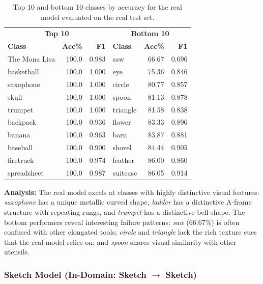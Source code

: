 \documentclass[12pt, a4paper]{article}
\begin{document}
\begin{table}[H]
\centering
\caption{Top 10 and bottom 10 classes by accuracy for the real model evaluated
on the real test set.}
\label{tab:top_bottom_real}
\begin{tabular}{lrr|lrr}
\toprule
\multicolumn{3}{c|}{\textbf{Top 10}} & \multicolumn{3}{c}{\textbf{Bottom 10}} \\
\textbf{Class} & \textbf{Acc\%} & \textbf{F1} &
\textbf{Class} & \textbf{Acc\%} & \textbf{F1} \\
\midrule
The Mona Lisa     & 100.0 & 0.983 & saw        & 66.67 & 0.696 \\
basketball        & 100.0 & 1.000 & eye        & 75.36 & 0.846 \\
saxophone         & 100.0 & 1.000 & circle     & 80.77 & 0.857 \\
skull              & 100.0 & 1.000 & spoon      & 81.13 & 0.878 \\
trumpet           & 100.0 & 1.000 & triangle   & 81.58 & 0.838 \\
backpack          & 100.0 & 0.936 & flower     & 83.33 & 0.896 \\
banana            & 100.0 & 0.963 & barn       & 83.87 & 0.881 \\
baseball          & 100.0 & 0.900 & shovel     & 84.44 & 0.905 \\
firetruck         & 100.0 & 0.974 & feather    & 86.00 & 0.860 \\
spreadsheet       & 100.0 & 0.987 & suitcase   & 86.05 & 0.914 \\
\bottomrule
\end{tabular}
\end{table}

\textbf{Analysis:} The real model excels at classes with highly distinctive
visual features: \emph{saxophone} has a unique metallic curved shape,
\emph{ladder} has a distinctive A-frame structure with repeating rungs, and \emph{trumpet}
has a distinctive bell shape.  The bottom performers reveal interesting failure
patterns: \emph{saw} (66.67\%) is often confused with other elongated tools;
\emph{circle} and \emph{triangle} lack the rich texture cues that the
real model relies on; and \emph{spoon} shares visual similarity with other
utensils.

\subsubsection{Sketch Model (In-Domain: Sketch $\to$ Sketch)}
\end{document}
